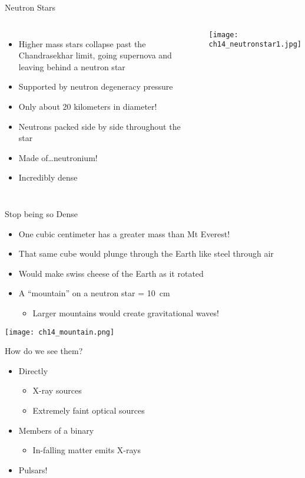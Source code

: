 \documentclass[pdf,aspectratio=169]{beamer}
\begin{document}
\begin{frame}{Neutron Stars}
  \begin{columns}
	\begin{itemize}
	  \item Higher mass stars collapse past the Chandrasekhar limit, going supernova and leaving behind a neutron star
	  \item Supported by \alert{neutron} degeneracy pressure
	  \item Only about 20 kilometers in diameter!
	  \item Neutrons packed side by side throughout the star
	  \item Made of\ldots \alert{neutronium}!
	  \item Incredibly dense
	\end{itemize}
	\begin{center}
	  \texttt{[image: ch14\_neutronstar1.jpg]}
	\end{center}
  \end{columns}
\end{frame}

\begin{frame}{Stop being so Dense}
  \begin{itemize}
	\item One cubic centimeter has a greater mass than Mt Everest!
	\item That same cube would plunge through the Earth like steel through air
	\item Would make swiss cheese of the Earth as it rotated
	\item A ``mountain'' on a neutron star = \SI{10}{\centi\meter}
	  \begin{itemize}
		\item Larger mountains would create gravitational waves!
	  \end{itemize}
  \end{itemize}
  \begin{center}
	\texttt{[image: ch14\_mountain.png]}
  \end{center}
\end{frame}

\begin{frame}{How do we see them?}
  \begin{itemize}
	\item Directly
	  \begin{itemize}
		\item X-ray sources
		\item Extremely faint optical sources
	  \end{itemize}
	\item Members of a binary
	  \begin{itemize}
		\item In-falling matter emits X-rays
	  \end{itemize}
	\item Pulsars!
  \end{itemize}
\end{frame}
\end{document}

